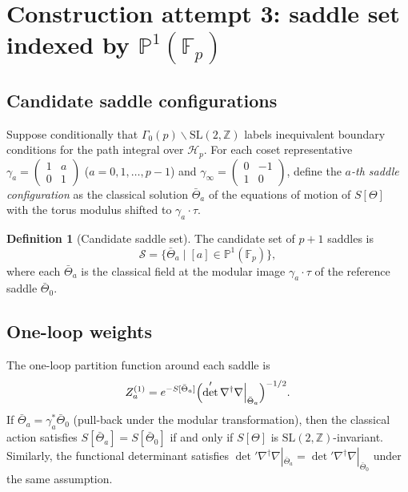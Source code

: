 \documentclass[12pt,a4paper]{article}
\theoremstyle{definition}
\newtheorem{definition}[theorem]{Definition}
\theoremstyle{remark}
\newcommand{\SL}{\mathrm{SL}}
\newcommand{\ZZ}{\mathbb{Z}}
\newcommand{\FF}{\mathbb{F}}
\newcommand{\PP}{\mathbb{P}}
\newcommand{\Gam}{\Gamma}
\newcommand{\Hp}{\mathcal{H}_p}
\begin{document}
\section{Construction attempt 3: saddle set indexed by $\PP^1(\FF_p)$}
\label{sec:saddles}

\subsection{Candidate saddle configurations}

Suppose conditionally that $\Gam_0(p)\backslash\SL(2,\ZZ)$ labels
inequivalent boundary conditions for the path integral over $\Hp$.
For each coset representative
$\gamma_a = \left(\begin{smallmatrix}1&a\\0&1\end{smallmatrix}\right)$
($a=0,1,\ldots,p-1$) and
$\gamma_\infty = \left(\begin{smallmatrix}0&-1\\1&0\end{smallmatrix}\right)$,
define the \emph{$a$-th saddle configuration} as the classical solution
$\bar\Theta_a$ of the equations of motion of $S[\Theta]$ with the torus
modulus shifted to $\gamma_a\cdot\tau$.

\begin{definition}[Candidate saddle set]
\label{def:saddles}
The candidate set of $p+1$ saddles is
\[
  \mathcal{S} = \bigl\{\bar\Theta_a \;\big|\; [a]\in\PP^1(\FF_p)\bigr\},
\]
where each $\bar\Theta_a$ is the classical field at the modular image
$\gamma_a\cdot\tau$ of the reference saddle $\bar\Theta_0$.
\end{definition}

\subsection{One-loop weights}

The one-loop partition function around each saddle is
\begin{equation}
  Z_a^{(1)} = e^{-S[\bar\Theta_a]}
              \Bigl(\det'\nabla^\dagger\nabla\Big|_{\bar\Theta_a}\Bigr)^{-1/2}.
  \label{eq:1loop}
\end{equation}
If $\bar\Theta_a = \gamma_a^*\bar\Theta_0$ (pull-back under the modular
transformation), then the classical action satisfies
$S[\bar\Theta_a]=S[\bar\Theta_0]$ if and only if $S[\Theta]$ is
$\SL(2,\ZZ)$-invariant.  Similarly, the functional determinant satisfies
$\det'\nabla^\dagger\nabla|_{\bar\Theta_a}=\det'\nabla^\dagger\nabla|_{\bar\Theta_0}$
under the same assumption.
\end{document}
